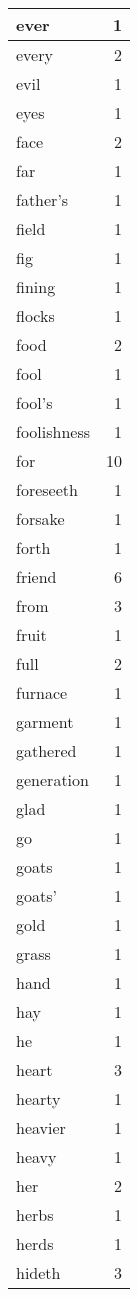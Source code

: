 \begin{center}
\begin{longtable}{l|r}
ever & 1\\ \hline 
every & 2\\ \hline 
evil & 1\\ \hline 
eyes & 1\\ \hline 
face & 2\\ \hline 
far & 1\\ \hline 
father's & 1\\ \hline 
field & 1\\ \hline 
fig & 1\\ \hline 
fining & 1\\ \hline 
flocks & 1\\ \hline 
food & 2\\ \hline 
fool & 1\\ \hline 
fool's & 1\\ \hline 
foolishness & 1\\ \hline 
for & 10\\ \hline 
foreseeth & 1\\ \hline 
forsake & 1\\ \hline 
forth & 1\\ \hline 
friend & 6\\ \hline 
from & 3\\ \hline 
fruit & 1\\ \hline 
full & 2\\ \hline 
furnace & 1\\ \hline 
garment & 1\\ \hline 
gathered & 1\\ \hline 
generation & 1\\ \hline 
glad & 1\\ \hline 
go & 1\\ \hline 
goats & 1\\ \hline 
goats' & 1\\ \hline 
gold & 1\\ \hline 
grass & 1\\ \hline 
hand & 1\\ \hline 
hay & 1\\ \hline 
he & 1\\ \hline 
heart & 3\\ \hline 
hearty & 1\\ \hline 
heavier & 1\\ \hline 
heavy & 1\\ \hline 
her & 2\\ \hline 
herbs & 1\\ \hline 
herds & 1\\ \hline 
hideth & 3\\ \hline 

\end{longtable}
\end{center}
